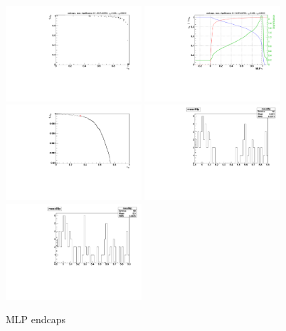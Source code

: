 \begin{figure}
  \centering
 \includegraphics[width=0.45\textwidth]{Figures/mlp/MLP_endcaps_roc}
  \includegraphics[width=0.45\textwidth]{Figures/mlp/MLP_endcaps_eff}
  \includegraphics[width=0.45\textwidth]{Figures/mlp/MLP_endcaps_roc_zoom}
  \includegraphics[width=0.45\textwidth]{Figures/mlp/MLP_endcaps_mass}
  \includegraphics[width=0.45\textwidth]{Figures/mlp/MLP_endcaps_mass_unblind}
\caption{MLP endcaps}
\end{figure}
